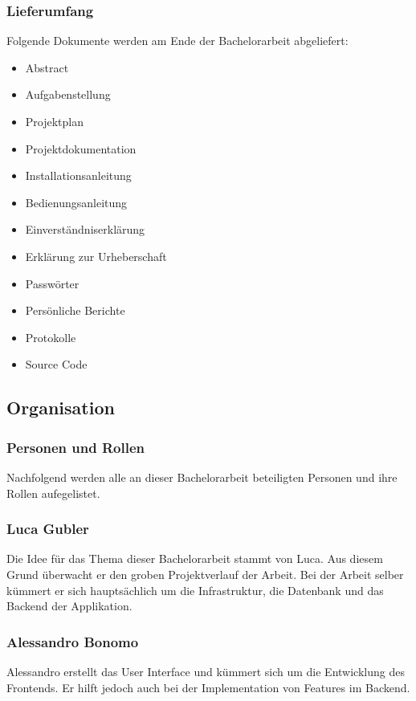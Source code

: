 \subsubsection*{Lieferumfang}
Folgende Dokumente werden am Ende der Bachelorarbeit abgeliefert:
\begin{itemize}
	\itemsep0em
	\item Abstract
	\item Aufgabenstellung
	\item Projektplan
	\item Projektdokumentation
	\item Installationsanleitung
	\item Bedienungsanleitung
	\item Einverständniserklärung
	\item Erklärung zur Urheberschaft
	\item Passwörter
	\item Persönliche Berichte
	\item Protokolle
	\item Source Code	
\end{itemize}



\subsection{Organisation}
\subsubsection*{Personen und Rollen}
Nachfolgend werden alle an dieser Bachelorarbeit beteiligten Personen und ihre Rollen aufegelistet.

\subsubsection*{Luca Gubler}
Die Idee für das Thema dieser Bachelorarbeit stammt von Luca. Aus diesem Grund überwacht er den groben Projektverlauf der Arbeit. Bei der Arbeit selber kümmert er sich hauptsächlich um die Infrastruktur, die Datenbank und das Backend der Applikation.

\subsubsection*{Alessandro Bonomo}
Alessandro erstellt das User Interface und kümmert sich um die Entwicklung des Frontends. Er hilft jedoch auch bei der Implementation von Features im Backend.

